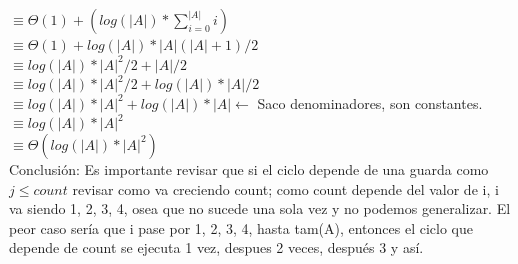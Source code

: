 \documentclass[10pt,a4paper]{article}
\begin{document}
$ \equiv \Theta(1) + (log(|A|) * \sum_{i=0}^{|A|}{i}) $ \\ 
$ \equiv \Theta(1) + log(|A|) * |A|(|A|+1)/2  $ \\ 
$ \equiv log(|A|) * |A|^{2}/2 + |A|/2  $ \\ 
$ \equiv log(|A|) * |A|^{2}/2 + log(|A|) * |A|/2   $ \\ 
$ \equiv log(|A|) * |A|^{2} + log(|A|) * |A|  \leftarrow $ Saco denominadores, son constantes. \\ 
$ \equiv log(|A|) * |A|^{2} $ \\ 
$ \equiv \Theta(log(|A|) * |A|^{2}) $ \\
Conclusión: Es importante revisar que si el ciclo depende de una guarda como $ j \le count$ revisar como va creciendo count; como count depende del valor de i, i va siendo 1, 2, 3, 4, osea que no sucede una sola vez y no podemos generalizar. El peor caso sería que i pase por 1, 2, 3, 4, hasta tam(A), entonces el ciclo que depende de count se ejecuta 1 vez, despues 2 veces, después 3 y así.
\end{document}
